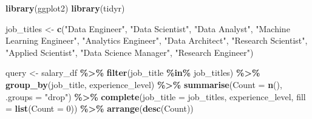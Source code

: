 \documentclass[
]{article}
\newenvironment{Shaded}{\begin{snugshade}}{\end{snugshade}}
\newcommand{\AttributeTok}[1]{\textcolor[rgb]{0.13,0.29,0.53}{#1}}
\newcommand{\DecValTok}[1]{\textcolor[rgb]{0.00,0.00,0.81}{#1}}
\newcommand{\FunctionTok}[1]{\textcolor[rgb]{0.13,0.29,0.53}{\textbf{#1}}}
\newcommand{\NormalTok}[1]{#1}
\newcommand{\OtherTok}[1]{\textcolor[rgb]{0.56,0.35,0.01}{#1}}
\newcommand{\SpecialCharTok}[1]{\textcolor[rgb]{0.81,0.36,0.00}{\textbf{#1}}}
\newcommand{\StringTok}[1]{\textcolor[rgb]{0.31,0.60,0.02}{#1}}
\begin{document}
\begin{Shaded}
\begin{Highlighting}[]
\FunctionTok{library}\NormalTok{(ggplot2)}
\FunctionTok{library}\NormalTok{(tidyr)}

\NormalTok{job\_titles }\OtherTok{\textless{}{-}} \FunctionTok{c}\NormalTok{(}\StringTok{"Data Engineer"}\NormalTok{, }\StringTok{"Data Scientist"}\NormalTok{, }\StringTok{"Data Analyst"}\NormalTok{, }\StringTok{"Machine Learning Engineer"}\NormalTok{, }\StringTok{"Analytics Engineer"}\NormalTok{, }\StringTok{"Data Architect"}\NormalTok{, }\StringTok{"Research Scientist"}\NormalTok{, }\StringTok{"Applied Scientist"}\NormalTok{, }\StringTok{"Data Science Manager"}\NormalTok{, }\StringTok{"Research Engineer"}\NormalTok{)}

\NormalTok{query }\OtherTok{\textless{}{-}}\NormalTok{ salary\_df }\SpecialCharTok{\%\textgreater{}\%}
  \FunctionTok{filter}\NormalTok{(job\_title }\SpecialCharTok{\%in\%}\NormalTok{ job\_titles) }\SpecialCharTok{\%\textgreater{}\%}
  \FunctionTok{group\_by}\NormalTok{(job\_title, experience\_level) }\SpecialCharTok{\%\textgreater{}\%}
  \FunctionTok{summarise}\NormalTok{(}\AttributeTok{Count =} \FunctionTok{n}\NormalTok{(), }\AttributeTok{.groups =} \StringTok{"drop"}\NormalTok{) }\SpecialCharTok{\%\textgreater{}\%}
  \FunctionTok{complete}\NormalTok{(}\AttributeTok{job\_title =}\NormalTok{ job\_titles, experience\_level, }\AttributeTok{fill =} \FunctionTok{list}\NormalTok{(}\AttributeTok{Count =} \DecValTok{0}\NormalTok{)) }\SpecialCharTok{\%\textgreater{}\%}
  \FunctionTok{arrange}\NormalTok{(}\FunctionTok{desc}\NormalTok{(Count))}


\end{Highlighting}
\end{Shaded}
\end{document}
